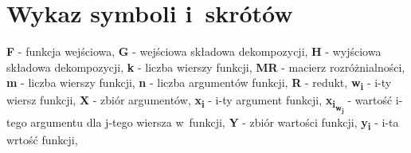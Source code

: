 \chapter*{Wykaz symboli i~skrótów}

\noindent
\textbf{F} - funkcja wejściowa, \newline
\textbf{G} - wejściowa składowa dekompozycji, \newline
\textbf{H} - wyjściowa składowa dekompozycji, \newline
\textbf{k} - liczba wierszy funkcji, \newline
\textbf{MR} - macierz rozróżnialności, \newline
\textbf{m} - liczba wierszy funkcji, \newline
\textbf{n} - liczba argumentów funkcji, \newline
\textbf{R} - redukt, \newline
\textbf{w\textsubscript{i}} - i-ty wiersz funkcji,\newline
\textbf{X} - zbiór argumentów, \newline
\textbf{x\textsubscript{i}} - i-ty argument funkcji, \newline
\textbf{x\textsubscript{i\textsubscript{w\textsubscript{j}}}} - wartość i-tego argumentu dla j-tego wiersza w~funkcji, \newline
\textbf{Y} - zbiór wartości funkcji, \newline
\textbf{y\textsubscript{i}} - i-ta wrtość funkcji, \newline

\cleardoublepage